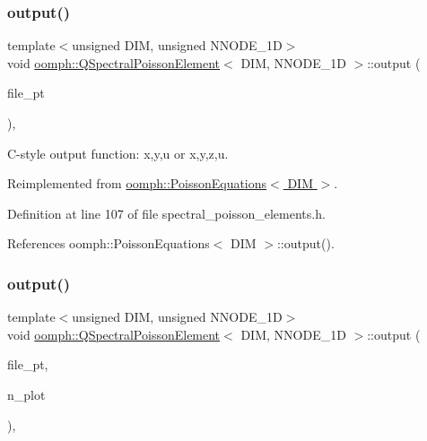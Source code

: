 \subsubsection{\texorpdfstring{output()}{output()}\hspace{0.1cm}{\footnotesize\ttfamily [3/4]}}
{\footnotesize\ttfamily template$<$unsigned D\+IM, unsigned N\+N\+O\+D\+E\+\_\+1D$>$ \\
void \hyperlink{classoomph_1_1QSpectralPoissonElement}{oomph\+::\+Q\+Spectral\+Poisson\+Element}$<$ D\+IM, N\+N\+O\+D\+E\+\_\+1D $>$\+::output (\begin{DoxyParamCaption}\item[{F\+I\+LE $\ast$}]{file\+\_\+pt }\end{DoxyParamCaption})\hspace{0.3cm}{\ttfamily [inline]}, {\ttfamily [virtual]}}



C-\/style output function\+: x,y,u or x,y,z,u. 



Reimplemented from \hyperlink{classoomph_1_1PoissonEquations_afeaa8b136b9cc9649635b41bde1b5cda}{oomph\+::\+Poisson\+Equations$<$ D\+I\+M $>$}.



Definition at line 107 of file spectral\+\_\+poisson\+\_\+elements.\+h.



References oomph\+::\+Poisson\+Equations$<$ D\+I\+M $>$\+::output().

\mbox{\label{classoomph_1_1QSpectralPoissonElement_aa3a03bc9793e976facde1a49396f5b43}} 
\subsubsection{\texorpdfstring{output()}{output()}\hspace{0.1cm}{\footnotesize\ttfamily [4/4]}}
{\footnotesize\ttfamily template$<$unsigned D\+IM, unsigned N\+N\+O\+D\+E\+\_\+1D$>$ \\
void \hyperlink{classoomph_1_1QSpectralPoissonElement}{oomph\+::\+Q\+Spectral\+Poisson\+Element}$<$ D\+IM, N\+N\+O\+D\+E\+\_\+1D $>$\+::output (\begin{DoxyParamCaption}\item[{F\+I\+LE $\ast$}]{file\+\_\+pt,  }\item[{const unsigned \&}]{n\+\_\+plot }\end{DoxyParamCaption})\hspace{0.3cm}{\ttfamily [inline]}, {\ttfamily [virtual]}}



